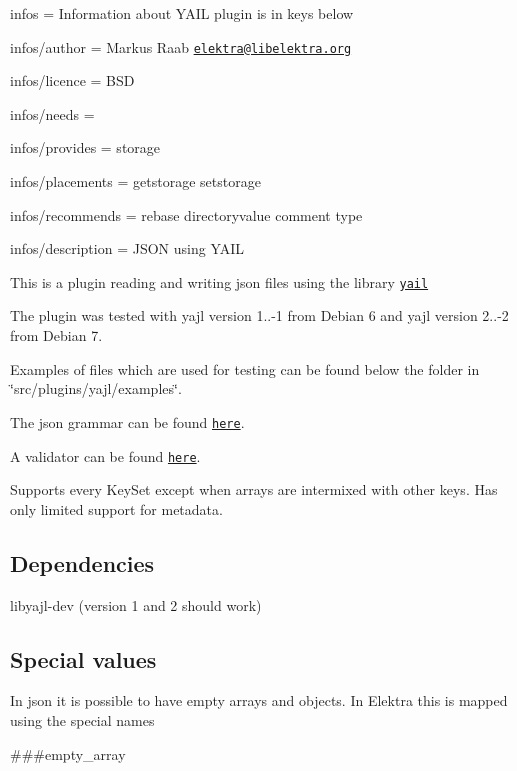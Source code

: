
\begin{DoxyItemize}
\item infos = Information about Y\+A\+I\+L plugin is in keys below
\item infos/author = Markus Raab \href{mailto:elektra@libelektra.org}{\tt elektra@libelektra.\+org}
\item infos/licence = B\+S\+D
\item infos/needs =
\item infos/provides = storage
\item infos/placements = getstorage setstorage
\item infos/recommends = rebase directoryvalue comment type
\item infos/description = J\+S\+O\+N using Y\+A\+I\+L
\end{DoxyItemize}

This is a plugin reading and writing json files using the library \href{http://lloyd.github.com/yajl/}{\tt yail}

The plugin was tested with yajl version 1..-\/1 from Debian 6 and yajl version 2..-\/2 from Debian 7.

Examples of files which are used for testing can be found below the folder in \char`\"{}src/plugins/yajl/examples\char`\"{}.

The json grammar can be found \href{http://www.ietf.org/rfc/rfc4627.txt}{\tt here}.

A validator can be found \href{http://jsonlint.com/}{\tt here}.

Supports every Key\+Set except when arrays are intermixed with other keys. Has only limited support for metadata.

\subsection*{Dependencies}


\begin{DoxyItemize}
\item {\ttfamily libyajl-\/dev} (version 1 and 2 should work)
\end{DoxyItemize}

\subsection*{Special values}

In json it is possible to have empty arrays and objects. In Elektra this is mapped using the special names \begin{DoxyVerb}    ###empty_array
\end{DoxyVerb}


